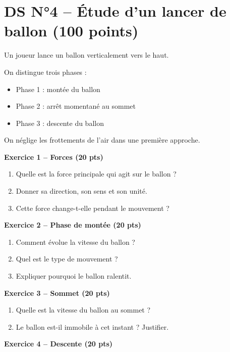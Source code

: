 \documentclass[11pt,a4paper]{article}
\begin{document}
\newpage
\section*{DS N°4 – Étude d’un lancer de ballon (100 points)}

Un joueur lance un ballon verticalement vers le haut.

On distingue trois phases :
\begin{itemize}
\item Phase 1 : montée du ballon
\item Phase 2 : arrêt momentané au sommet
\item Phase 3 : descente du ballon
\end{itemize}

On néglige les frottements de l’air dans une première approche.

\bigskip

\textbf{Exercice 1 – Forces (20 pts)}

\begin{enumerate}
\item Quelle est la force principale qui agit sur le ballon ?
\item Donner sa direction, son sens et son unité.
\item Cette force change-t-elle pendant le mouvement ?
\end{enumerate}

\bigskip

\textbf{Exercice 2 – Phase de montée (20 pts)}

\begin{enumerate}
\item Comment évolue la vitesse du ballon ?
\item Quel est le type de mouvement ?
\item Expliquer pourquoi le ballon ralentit.
\end{enumerate}

\bigskip

\textbf{Exercice 3 – Sommet (20 pts)}

\begin{enumerate}
\item Quelle est la vitesse du ballon au sommet ?
\item Le ballon est-il immobile à cet instant ? Justifier.
\end{enumerate}

\bigskip

\textbf{Exercice 4 – Descente (20 pts)}
\end{document}
